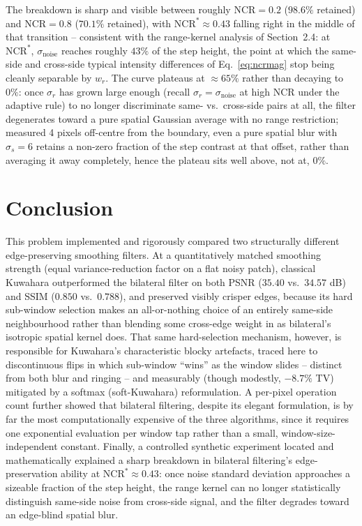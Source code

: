 \documentclass[11pt]{article}
\begin{document}
The breakdown is sharp and visible between roughly NCR$=0.2$ ($98.6\%$ retained) and
NCR$=0.8$ ($70.1\%$ retained), with $\text{NCR}^*\approx0.43$ falling right in the
middle of that transition -- consistent with the range-kernel analysis of
Section~2.4: at $\text{NCR}^*$, $\sigma_{\text{noise}}$ reaches roughly $43\%$ of the
step height, the point at which the same-side and cross-side typical intensity
differences of Eq.~\eqref{eq:ncrmag} stop being cleanly separable by $w_r$. The curve
plateaus at $\approx65\%$ rather than decaying to $0\%$: once $\sigma_r$ has grown large
enough (recall $\sigma_r=\sigma_{\text{noise}}$ at high NCR under the adaptive rule) to
no longer discriminate same- vs.\ cross-side pairs at all, the filter degenerates toward
a pure spatial Gaussian average with no range restriction; measured 4 pixels off-centre
from the boundary, even a pure spatial blur with $\sigma_s=6$ retains a non-zero
fraction of the step contrast at that offset, rather than averaging it away completely,
hence the plateau sits well above, not at, $0\%$.

\section{Conclusion}

This problem implemented and rigorously compared two structurally different
edge-preserving smoothing filters. At a quantitatively matched smoothing strength
(equal variance-reduction factor on a flat noisy patch), classical Kuwahara outperformed
the bilateral filter on both PSNR ($35.40$ vs.\ $34.57$ dB) and SSIM ($0.850$ vs.\
$0.788$), and preserved visibly crisper edges, because its hard sub-window selection
makes an all-or-nothing choice of an entirely same-side neighbourhood rather than
blending some cross-edge weight in as bilateral's isotropic spatial kernel does. That
same hard-selection mechanism, however, is responsible for Kuwahara's characteristic
blocky artefacts, traced here to discontinuous flips in which sub-window ``wins'' as the
window slides -- distinct from both blur and ringing -- and measurably (though modestly,
$-8.7\%$ TV) mitigated by a softmax (soft-Kuwahara) reformulation. A per-pixel operation
count further showed that bilateral filtering, despite its elegant formulation, is by
far the most computationally expensive of the three algorithms, since it requires one
exponential evaluation per window tap rather than a small, window-size-independent
constant. Finally, a controlled synthetic experiment located and mathematically
explained a sharp breakdown in bilateral filtering's edge-preservation ability at
$\text{NCR}^*\approx0.43$: once noise standard deviation approaches a sizeable fraction
of the step height, the range kernel can no longer statistically distinguish same-side
noise from cross-side signal, and the filter degrades toward an edge-blind spatial blur.
\end{document}
